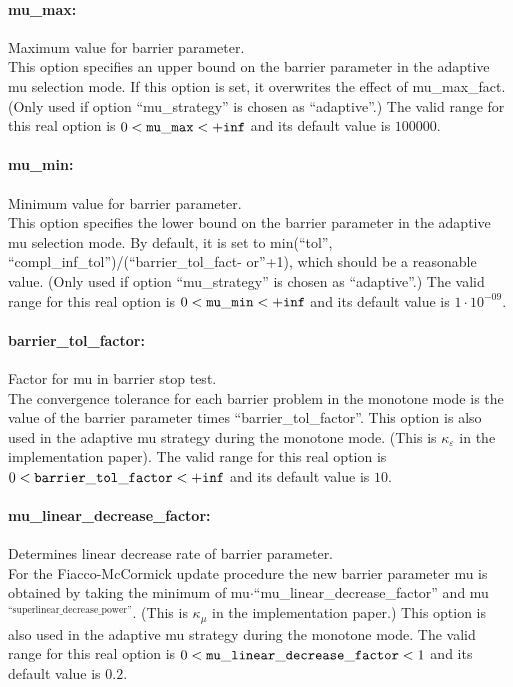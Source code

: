 \paragraph{mu\_max:} Maximum value for barrier parameter. $\;$ \\
 This option specifies an upper bound on the
barrier parameter in the adaptive mu selection
mode.  If this option is set, it overwrites the
effect of mu\_max\_fact. (Only used if option
``mu\_strategy'' is chosen as ``adaptive''.) The valid range for this real option is 
$0 <  {\tt mu\_max } <  {\tt +inf}$
and its default value is $100000$.


\paragraph{mu\_min:} Minimum value for barrier parameter. $\;$ \\
 This option specifies the lower bound on the
barrier parameter in the adaptive mu selection
mode. By default, it is set to
min(``tol'', ``compl\_inf\_tol'')/(``barrier\_tol\_fact-
or''+1), which should be a reasonable value. (Only
used if option ``mu\_strategy'' is chosen as
``adaptive''.) The valid range for this real option is 
$0 <  {\tt mu\_min } <  {\tt +inf}$
and its default value is $1 \cdot 10^{-09}$.

\paragraph{barrier\_tol\_factor:} Factor for mu in barrier stop test. $\;$ \\
 The convergence tolerance for each barrier
problem in the monotone mode is the value of the
barrier parameter times ``barrier\_tol\_factor''.
This option is also used in the adaptive mu
strategy during the monotone mode. (This is
$\kappa_\varepsilon$ in the implementation paper). The valid range for this real option is 
$0 <  {\tt barrier\_tol\_factor } <  {\tt +inf}$
and its default value is $10$.

\paragraph{mu\_linear\_decrease\_factor:} Determines linear decrease rate of barrier parameter. $\;$ \\
 For the Fiacco-McCormick update procedure the new
barrier parameter mu is obtained by taking the
minimum of mu$\cdot$``mu\_linear\_decrease\_factor'' and
mu$^\textrm{``superlinear\_decrease\_power''}$.  (This is
$\kappa_\mu$ in the implementation paper.) This option
is also used in the adaptive mu strategy during
the monotone mode. The valid range for this real option is 
$0 <  {\tt mu\_linear\_decrease\_factor } <  1$
and its default value is $0.2$.


